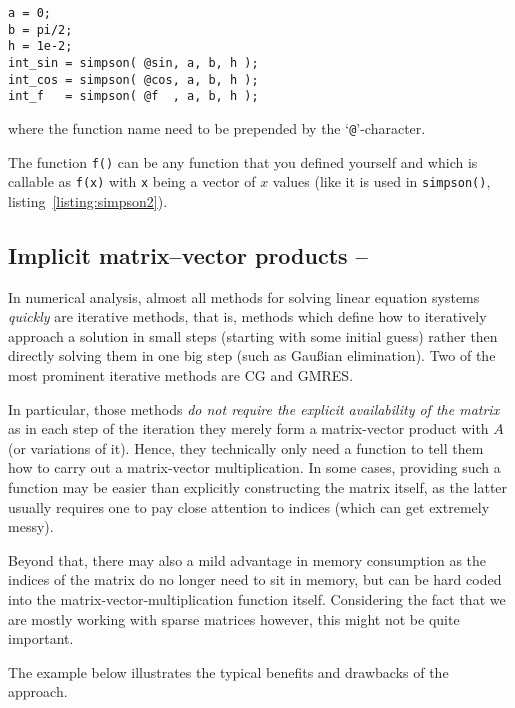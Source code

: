 \hfill
\begin{minipage}[t]{.90\textwidth}
\begin{lstlisting}[framerule=1pt,rulecolor=\color{goodgreen}]
a = 0;
b = pi/2;
h = 1e-2;
int_sin = simpson( @sin, a, b, h );
int_cos = simpson( @cos, a, b, h );
int_f   = simpson( @f  , a, b, h );
\end{lstlisting}
\end{minipage}
\hfill

where the function name need to be prepended by the `\lstinline!@!'-character.

The function \lstinline!f()! can be any function that you defined yourself and
which is callable as \lstinline!f(x)! with \lstinline!x! being a vector of $x$
values (like it is used in \lstinline!simpson()!, listing~\ref{listing:simpson2}).



\subsection{Implicit matrix--vector products -- \cleansymbol}

In numerical analysis, almost all methods for solving linear equation systems
\emph{quickly} are iterative methods, that is, methods which define how to
iteratively approach a solution in small steps (starting with some initial
guess) rather then directly solving them in one big step (such as Gau{\ss}ian
elimination). Two of the most prominent iterative methods are CG and GMRES.

In particular, those methods \emph{do not require the explicit availability of
the matrix} as in each step of the iteration they merely form a matrix-vector
product with $A$ (or variations of it). Hence, they technically only need a
function to tell them how to carry out a matrix-vector multiplication. In some
cases, providing such a function may be easier than explicitly constructing
the matrix itself, as the latter usually requires one to pay close attention
to indices (which can get extremely messy).

Beyond that, there may also a mild advantage in memory consumption as the
indices of the matrix do no longer need to sit in memory, but can be hard coded
into the matrix-vector-multiplication function itself. Considering the fact
that we are mostly working with sparse matrices however, this might not be
quite important.

The example below illustrates the typical benefits and drawbacks of the
approach.

